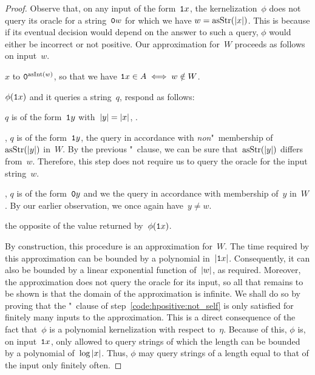 \begin{proof}
  Observe that, on any input of the form~$\textnormal{\texttt{1}}x$, the kernelization~$\phi$ does not query its oracle for a string~$\textnormal{\texttt{0}}w$ for which we have $w = \operatorname{asStr}({\lvert x\rvert})$.
  This is because if its eventual decision would depend on the answer to such a query, $\phi$ would either be incorrect or not positive.
  Our approximation for~$W$ proceeds as follows on input~$w$.
  \begin{codelisting}
  \item
     $x$ to $\bits{0}^{\asNat(w)}$, so that we have $\bits{1}x \in A \iff w \notin W$.
  \item
     $\phi(\bits{1}x)$ and  it queries a string~$q$, respond as follows:
    \begin{codelisting}
    \item\label{code:hpositive:not_self}%
       $q$ is of the form~$\bits{1}y$ with~$\length{y} = \length{x}$,  .
    \item
      ,  $q$ is of the form~$\bits{1}y$,  the query in accordance with \emph{non}"~membership of~$\asStr(\length{y})$ in~$W$.
      By the previous "~clause, we can be sure that~$\asStr(\length{y})$ differs from~$w$.
      Therefore, this step does not require us to query the oracle for the input string~$w$.
    \item
      , $q$ is of the form~$\bits{0}y$ and we  the query in accordance with membership of~$y$ in~$W$.
      By our earlier observation, we once again have~$y \neq w$.
    \end{codelisting}
    \item
       the opposite of the value returned by~$\phi(\textnormal{\texttt{1}}x)$.
  \end{codelisting}
  By construction, this procedure is an approximation for~$W$.
  The time required by this approximation can be bounded by a polynomial in~${\lvert\textnormal{\texttt{1}}x\rvert}$.
  Consequently, it can also be bounded by a linear exponential function of~${\lvert w\rvert}$, as required.
  Moreover, the approximation does not query the oracle for its input, so all that remains to be shown is that the domain of the approximation is infinite.
  We shall do so by proving that the "~clause of step~\ref{code:hpositive:not_self} is only satisfied for finitely many inputs to the approximation.
  This is a direct consequence of the fact that~$\phi$ is a polynomial kernelization with respect to~$\eta$.
  Because of this, $\phi$ is, on input~$\textnormal{\texttt{1}}x$, only allowed to query strings of which the length can be bounded by a polynomial of~$\log{\lvert x\rvert}$.
  Thus, $\phi$ may query strings of a length equal to that of the input only finitely often.
\end{proof}

